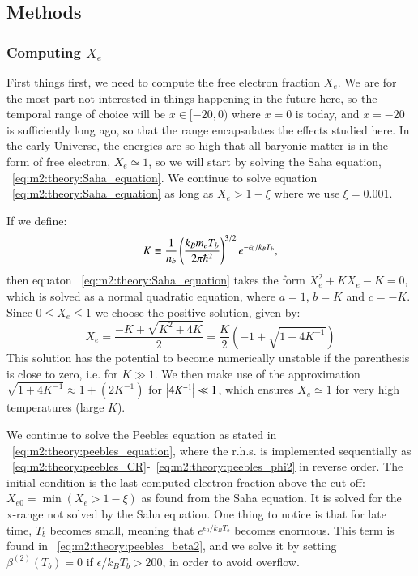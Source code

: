 \subsection{Methods}\label{sec:m2:methods}

\subsubsection{Computing $X_e$}\label{sec:m2:methods:electron_fraction}
    First things first, we need to compute the free electron fraction $X_e$. We are for the most part not interested in things happening in the future here, so the temporal range of choice will be $x\in[-20,0)$ where $x=0$ is today, and $x=-20$ is sufficiently long ago, so that the range encapsulates the effects studied here. In the early Universe, the energies are so high that all baryonic matter is in the form of free electron, $X_e\simeq1$, so we will start by solving the Saha equation, ~\cref{eq:m2:theory:Saha_equation}. We continue to solve equation ~\cref{eq:m2:theory:Saha_equation} as long as $X_e>1-\xi$ where we use $\xi=0.001$.

    If we define:
    \begin{equation}
        K \equiv \frac{1}{n_b}\left(\frac{k_Bm_eT_b}{2\pi\hbar^2}\right)^{3/2}e^{-\epsilon_0/k_BT_b},
    \end{equation}
    then equaton ~\cref{eq:m2:theory:Saha_equation} takes the form $X_e^2 + KX_e - K = 0$, which is solved as a normal quadratic equation, where $a=1$, $b=K$ and $c=-K$. Since $0\leq X_e\leq1$ we choose the positive solution, given by:
    \begin{equation}\label{eq:m2:methods:sqrt_approx}
        X_e = \frac{-K+\sqrt{K^2+4K}}{2} = \frac{K}{2}\left(-1+\sqrt{1+4K^{-1}}\right)
    \end{equation}
    This solution has the potential to become numerically unstable if the parenthesis is close to zero, i.e. for $K\gg1$. We then make use of the approximation $\sqrt{1+4K^{-1}} \approx 1+(2K^{-1})$ for $\abs{4K^{-1}}\ll1$, which ensures $X_e\simeq1$ for very high temperatures (large $K$).


    We continue to solve the Peebles equation as stated in ~\cref{eq:m2:theory:peebles_equation}, where the r.h.s. is implemented sequentially as ~\cref{eq:m2:theory:peebles_CR}-~\cref{eq:m2:theory:peebles_phi2} in reverse order. The initial condition is the last computed electron fraction above the cut-off: $X_{e0}=\min(X_e>1-\xi)$ as found from the Saha equation. It is solved for the x-range not solved by the Saha equation. One thing to notice is that for late time, $T_b$ becomes small, meaning that $e^{\epsilon_0/k_BT_b}$ becomes enormous. This term is found in ~\cref{eq:m2:theory:peebles_beta2}, and we solve it by setting $\beta^{(2)}(T_b)=0$ if $\epsilon/k_BT_b > 200$, in order to avoid overflow. 


